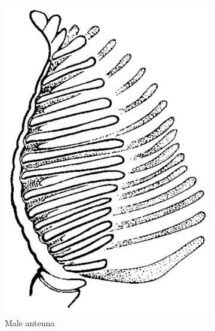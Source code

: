 \documentclass[letterpaper, 11pt]{article}
\begin{document}
\begin{figure}[ht!]
    \centering
    \begin{subfigure}[ht!]{0.14\textwidth}
        \includegraphics[width=\textwidth]{DiprionidAntenna}
        \caption{Male antenna}
        \label{fig:diprionid1}
    \end{subfigure}
    \qquad
    \begin{subfigure}[ht!]{0.42\textwidth}

\end{subfigure}
\end{figure}
\end{document}
